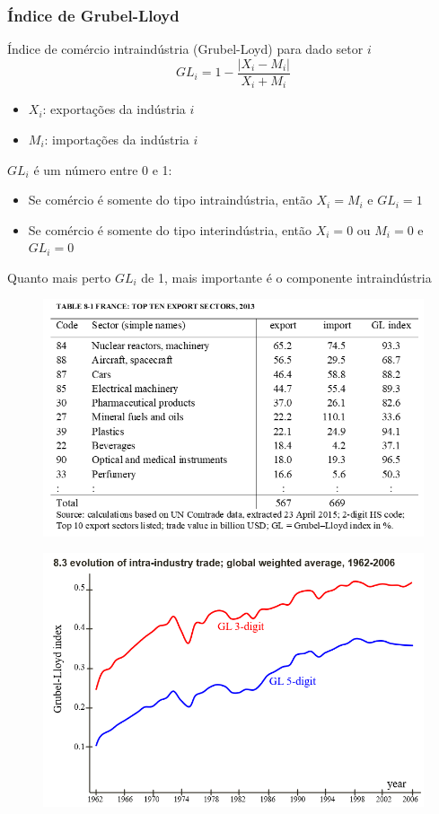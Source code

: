 \documentclass[a4paper,12pt]{article}[abntex2]
\begin{document}
\subsubsection{\textbf{Índice de Grubel-Lloyd}}
Índice de comércio intraindústria (Grubel-Loyd) para dado setor \(i\)
    \[
    GL_i=1-\frac{|X_i-M_i|}{X_i+M_i}
    \]\begin{itemize}
    \item \(X_i\): exportações da indústria \(i\)
    \item \(M_i\): importações da indústria \(i\)
\end{itemize}

\(GL_i\) é um número entre 0 e 1:\begin{itemize}
    \item Se comércio é somente do tipo intraindústria, então \(X_i=M_i\) e \(GL_i = 1\)
    \item Se comércio é somente do tipo interindústria, então \(X_i=0\) ou \(M_i=0\) e \(GL_i = 0\)    
\end{itemize}

Quanto mais perto \(GL_i\) de 1, mais importante é o componente intraindústria

\begin{figure}[H]
    \centering
    \includegraphics[width=0.7\linewidth]{Imagens/a16i2.png}
\end{figure}

\begin{figure}[H]
    \centering
    \includegraphics[width=0.7\linewidth]{Imagens/a16i3.png}
\end{figure}
\end{document}
